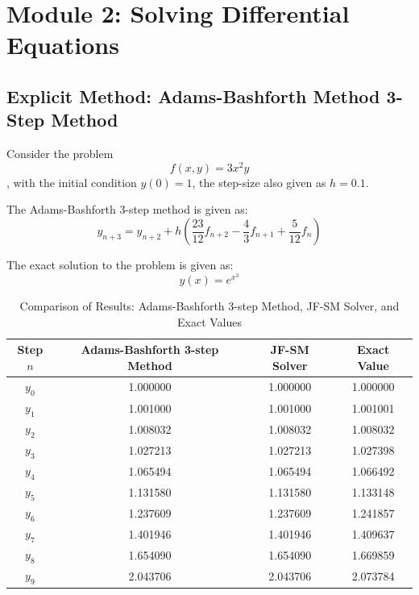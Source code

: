 \documentclass[a4paper, twoside]{report} %
\begin{document}
	\section{Module 2: Solving Differential Equations}

	\subsection{Explicit Method: Adams-Bashforth Method 3-Step Method}
	Consider the problem \begin{equation}
		f(x,y) = 3x^2y
	\end{equation}, with the initial condition $y(0) = 1$, the step-size also given as $h = 0.1$.

	The Adams-Bashforth 3-step method is given as:
	\begin{equation}
		y_{n+3}  = y_{n+2} + h \left(\frac{23}{12}f_{n+2} - \frac{4}{3}f_{n+1} + \frac{5}{12}f_{n}\right)
	\end{equation}

	The exact solution to the problem is given as:
	\begin{equation}
		y(x) = e^{x^3}
	\end{equation}




	\begin{table}[htbp]
		\centering
		\begin{tabular}{|c|c|c|c|}
			\hline
			Step $n$ & Adams-Bashforth 3-step Method & JF-SM Solver & Exact Value \\
			\hline
			$y_0$ & 1.000000 & 1.000000 & 1.000000 \\
			$y_1$ & 1.001000 & 1.001000 & 1.001001 \\
			$y_2$ & 1.008032 & 1.008032 & 1.008032 \\
			$y_3$ & 1.027213 & 1.027213 & 1.027398 \\
			$y_4$ & 1.065494 & 1.065494 & 1.066492 \\
			$y_5$ & 1.131580 & 1.131580 & 1.133148 \\
			$y_6$ & 1.237609 & 1.237609 & 1.241857 \\
			$y_7$ & 1.401946 & 1.401946 & 1.409637 \\
			$y_8$ & 1.654090 & 1.654090 & 1.669859 \\
			$y_9$ & 2.043706 & 2.043706 & 2.073784 \\
			\hline
		\end{tabular}
		\caption{Comparison of Results: Adams-Bashforth 3-step Method, JF-SM Solver, and Exact Values}
		\label{tab:comparison}
	\end{table}
\end{document}
